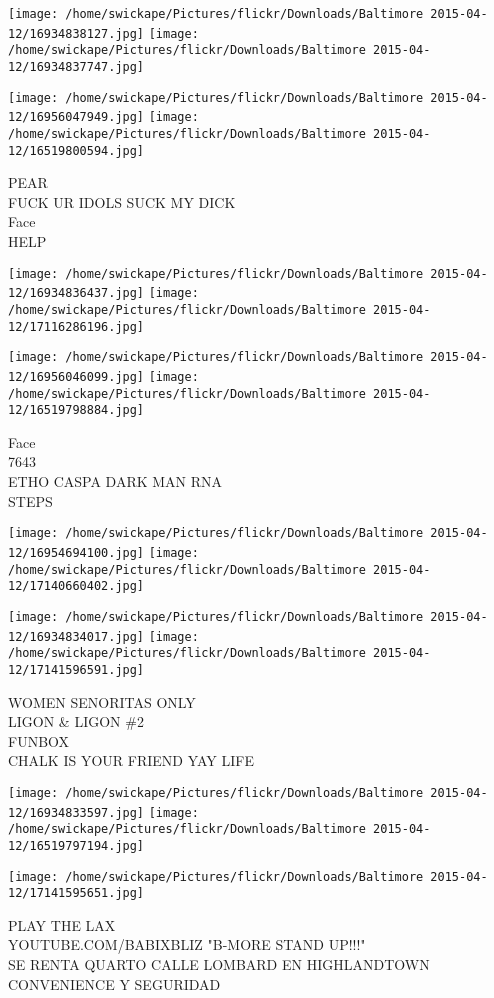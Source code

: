 \documentclass[10pt,letterpaper]{article}
\begin{document}
\texttt{[image: /home/swickape/Pictures/flickr/Downloads/Baltimore 2015-04-12/16934838127.jpg]}
\texttt{[image: /home/swickape/Pictures/flickr/Downloads/Baltimore 2015-04-12/16934837747.jpg]}

\texttt{[image: /home/swickape/Pictures/flickr/Downloads/Baltimore 2015-04-12/16956047949.jpg]}
\texttt{[image: /home/swickape/Pictures/flickr/Downloads/Baltimore 2015-04-12/16519800594.jpg]}

PEAR\\
FUCK UR IDOLS SUCK MY DICK\\
Face\\
HELP\\
\pagebreak

\texttt{[image: /home/swickape/Pictures/flickr/Downloads/Baltimore 2015-04-12/16934836437.jpg]}
\texttt{[image: /home/swickape/Pictures/flickr/Downloads/Baltimore 2015-04-12/17116286196.jpg]}

\texttt{[image: /home/swickape/Pictures/flickr/Downloads/Baltimore 2015-04-12/16956046099.jpg]}
\texttt{[image: /home/swickape/Pictures/flickr/Downloads/Baltimore 2015-04-12/16519798884.jpg]}

Face\\
7643\\
ETHO CASPA DARK MAN RNA\\
STEPS\\
\pagebreak

\texttt{[image: /home/swickape/Pictures/flickr/Downloads/Baltimore 2015-04-12/16954694100.jpg]}
\texttt{[image: /home/swickape/Pictures/flickr/Downloads/Baltimore 2015-04-12/17140660402.jpg]}

\texttt{[image: /home/swickape/Pictures/flickr/Downloads/Baltimore 2015-04-12/16934834017.jpg]}
\texttt{[image: /home/swickape/Pictures/flickr/Downloads/Baltimore 2015-04-12/17141596591.jpg]}

WOMEN SENORITAS ONLY\\
LIGON \& LIGON \#2\\
FUNBOX\\
CHALK IS YOUR FRIEND YAY LIFE\\
\pagebreak

\texttt{[image: /home/swickape/Pictures/flickr/Downloads/Baltimore 2015-04-12/16934833597.jpg]}
\texttt{[image: /home/swickape/Pictures/flickr/Downloads/Baltimore 2015-04-12/16519797194.jpg]}

\texttt{[image: /home/swickape/Pictures/flickr/Downloads/Baltimore 2015-04-12/17141595651.jpg]}

PLAY THE LAX\\
YOUTUBE.COM/BABIXBLIZ "B{-}MORE STAND UP!!!"\\
SE RENTA QUARTO CALLE LOMBARD EN HIGHLANDTOWN CONVENIENCE Y SEGURIDAD\\
\pagebreak
\end{document}
